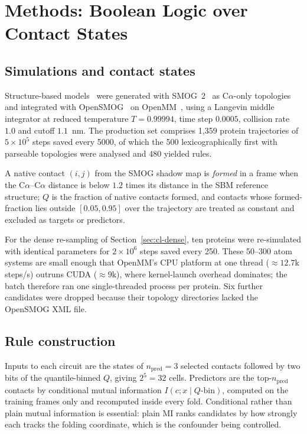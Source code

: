 \section{Methods: Boolean Logic over Contact States}
\label{sec:methods-contact-logic}

\subsection{Simulations and contact states}
Structure-based models~\cite{clementi2000sbm} were generated with
SMOG~2~\cite{noel2016smog2} as C$\alpha$-only topologies and integrated with
OpenSMOG~\cite{oliveira2021opensmog} on OpenMM~\cite{eastman2017openmm}, using a
Langevin middle integrator at reduced temperature $T = 0.99994$, time step
$0.0005$, collision rate $1.0$ and cutoff $1.1$~nm.  The production set
comprises 1{,}359 protein trajectories of $5\times10^{5}$ steps saved every
5000, of which the 500 lexicographically first with parseable topologies were
analysed and 480 yielded rules.

A native contact $(i,j)$ from the SMOG shadow map is \emph{formed} in a frame
when the C$\alpha$--C$\alpha$ distance is below $1.2$ times its distance in the
SBM reference structure; $Q$ is the fraction of native contacts formed, and
contacts whose formed-fraction lies outside $[0.05, 0.95]$ over the trajectory
are treated as constant and excluded as targets or predictors.

For the dense re-sampling of Section~\ref{sec:cl-dense}, ten proteins were
re-simulated with identical parameters for $2\times10^{6}$ steps saved every
250.  These 50--300 atom systems are small enough that OpenMM's CPU platform at
one thread ($\approx 12.7$k steps/s) outruns CUDA ($\approx 9$k), where
kernel-launch overhead dominates; the batch therefore ran one single-threaded
process per protein.  Six further candidates were dropped because their
topology directories lacked the OpenSMOG XML file.

\subsection{Rule construction}
Inputs to each circuit are the states of $n_{\mathrm{pred}} = 3$ selected
contacts followed by two bits of the quantile-binned $Q$, giving $2^5 = 32$
cells.  Predictors are the top-$n_{\mathrm{pred}}$ contacts by conditional
mutual information $I(c; x \mid Q\text{-bin})$, computed on the training frames
only and recomputed inside every fold.  Conditional rather than plain mutual
information is essential: plain MI ranks candidates by how strongly each tracks
the folding coordinate, which is the confounder being controlled.

